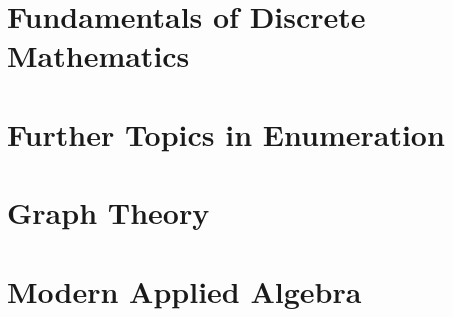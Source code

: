 \documentclass[table]{book}
\author{Joseph M. Diza}
\theoremstyle{definition}
\begin{document}
\thispagestyle{empty}

\thispagestyle{plain}
\tableofcontents
\cleardoublepage

\part{Fundamentals of Discrete Mathematics}


\part{Further Topics in Enumeration}
\part{Graph Theory}
\part{Modern Applied Algebra}
\end{document}
